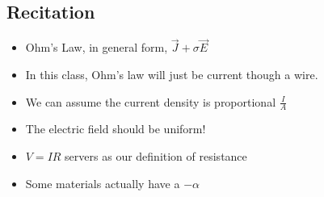 \documentclass[11pt]{article}
\begin{document}
\subsection{Recitation}
\begin{itemize}
    \item Ohm's Law, in general form, $\vec{J} + \sigma \vec{E}$
    \item In this class, Ohm's law will just be current though a wire.
    \item We can assume the current density is proportional $\frac{I}{A}$
    \item The electric field should be uniform!
    \item $V = IR$ servers as our definition of resistance
    \item Some materials actually have a $-\alpha$
\end{itemize}
\end{document}
